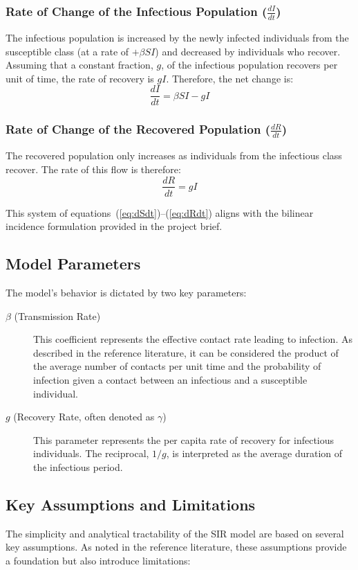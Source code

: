 \documentclass[12pt, a4paper]{article}
\begin{document}
\subsubsection{Rate of Change of the Infectious Population ($\frac{dI}{dt}$)}
The infectious population is increased by the newly infected individuals from the susceptible class (at a rate of $+\beta SI$) and decreased by individuals who recover. Assuming that a constant fraction, $g$, of the infectious population recovers per unit of time, the rate of recovery is $gI$. Therefore, the net change is:
\begin{equation} \label{eq:dIdt}
\frac{dI}{dt} = \beta SI - gI
\end{equation}

\subsubsection{Rate of Change of the Recovered Population ($\frac{dR}{dt}$)}
The recovered population only increases as individuals from the infectious class recover. The rate of this flow is therefore:
\begin{equation} \label{eq:dRdt}
\frac{dR}{dt} = gI
\end{equation}

This system of equations~(\ref{eq:dSdt})--(\ref{eq:dRdt}) aligns with the bilinear incidence formulation provided in the project brief.


\subsection{Model Parameters}
The model's behavior is dictated by two key parameters:

\begin{description}
    \item[$\beta$ (Transmission Rate)] This coefficient represents the effective contact rate leading to infection. As described in the reference literature, it can be considered the product of the average number of contacts per unit time and the probability of infection given a contact between an infectious and a susceptible individual.
    \item[$g$ (Recovery Rate, often denoted as $\gamma$)] This parameter represents the per capita rate of recovery for infectious individuals. The reciprocal, $1/g$, is interpreted as the average duration of the infectious period.
\end{description}

\subsection{Key Assumptions and Limitations}
The simplicity and analytical tractability of the SIR model are based on several key assumptions. As noted in the reference literature, these assumptions provide a foundation but also introduce limitations:
\end{document}
